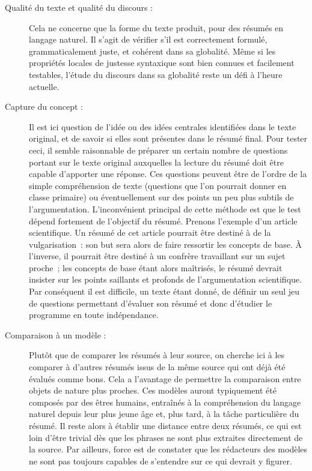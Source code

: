 \documentclass[a4paper, 12pt]{article}
\begin{document}
\begin{description}
  \item [Qualité du texte et qualité du discours :] Cela ne concerne que la forme du texte produit, pour des résumés en langage naturel. Il s'agit de vérifier s'il est correctement formulé, grammaticalement juste, et cohérent dans sa globalité. Même si les propriétés locales de justesse syntaxique sont bien connues et facilement testables, l'étude du discours dans sa globalité reste un défi à l'heure actuelle.
  \item [Capture du concept :] Il est ici question de l'idée ou des idées centrales identifiées dans le texte original, et de savoir si elles sont présentes dans le résumé final. Pour tester ceci, il semble raisonnable de préparer un certain nombre de questions portant sur le texte original auxquelles la lecture du résumé doit être capable d'apporter une réponse. Ces questions peuvent être de l'ordre de la simple compréhension de texte (questions que l'on pourrait donner en classe primaire) ou éventuellement sur des points un peu plus subtils de l'argumentation. L'inconvénient principal de cette méthode est que le test dépend fortement de l'objectif du résumé. Prenons l'exemple d'un article scientifique. Un résumé de cet article pourrait être destiné à de la vulgarisation~: son but sera alors de faire ressortir les concepts de base. À l'inverse, il pourrait être destiné à un confrère travaillant sur un sujet proche~; les concepts de base étant alors maîtrisés, le résumé devrait insister sur les points saillants et profonds de l'argumentation scientifique. Par conséquent il est difficile, un texte étant donné, de définir un seul jeu de questions permettant d'évaluer son résumé et donc d'étudier le programme en toute indépendance.
  \item [Comparaison à un modèle :] Plutôt que de comparer les résumés à leur source, on cherche ici à les comparer à d'autres résumés issus de la même source qui ont déjà été évalués comme bons. Cela a l'avantage de permettre la comparaison entre objets de nature plus proches. Ces modèles auront typiquement été composés par des êtres humains, entraînés à la compréhension du langage naturel depuis leur plus jeune âge et, plus tard, à la tâche particulière du résumé. Il reste alors à établir une distance entre deux résumés, ce qui est loin d'être trivial dès que les phrases ne sont plus extraites directement de la source. Par ailleurs, force est de constater que les rédacteurs des modèles ne sont pas toujours capables de s'entendre sur ce qui devrait y figurer.
 \end{description}
\end{document}
